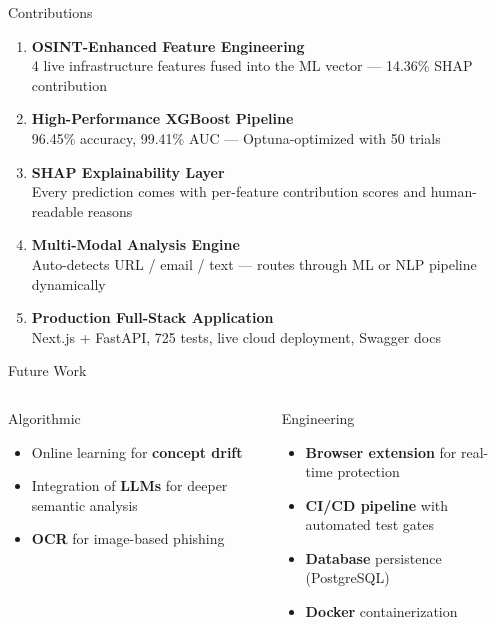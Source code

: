 \documentclass[aspectratio=169,10pt]{beamer}
\begin{document}
\begin{frame}{Contributions}
  \vspace{0.2cm}
  \begin{enumerate}
    \setlength{\itemsep}{0.6em}
    \item \textbf{OSINT-Enhanced Feature Engineering}\\
      {\small 4 live infrastructure features fused into the ML vector — 14.36\% SHAP contribution}
    \item \textbf{High-Performance XGBoost Pipeline}\\
      {\small 96.45\% accuracy, 99.41\% AUC — Optuna-optimized with 50 trials}
    \item \textbf{SHAP Explainability Layer}\\
      {\small Every prediction comes with per-feature contribution scores and human-readable reasons}
    \item \textbf{Multi-Modal Analysis Engine}\\
      {\small Auto-detects URL / email / text — routes through ML or NLP pipeline dynamically}
    \item \textbf{Production Full-Stack Application}\\
      {\small Next.js + FastAPI, 725 tests, live cloud deployment, Swagger docs}
  \end{enumerate}
\end{frame}

\begin{frame}{Future Work}
  \vspace{0.3cm}
  \begin{columns}[T]
      \begin{block}{Algorithmic}
        \begin{itemize}
          \setlength{\itemsep}{0.4em}
          \item Online learning for \textbf{concept drift}
          \item Integration of \textbf{LLMs} for deeper semantic analysis
          \item \textbf{OCR} for image-based phishing
        \end{itemize}
      \end{block}
      \begin{block}{Engineering}
        \begin{itemize}
          \setlength{\itemsep}{0.4em}
          \item \textbf{Browser extension} for real-time protection
          \item \textbf{CI/CD pipeline} with automated test gates
          \item \textbf{Database} persistence (PostgreSQL)
          \item \textbf{Docker} containerization
        \end{itemize}
      \end{block}
  \end{columns}
\end{frame}
\end{document}
